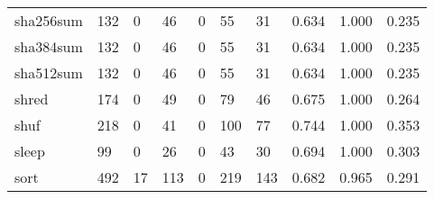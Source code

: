 \begin{longtable}{lp{2.0cm}p{2.0cm}p{2.0cm}p{2.0cm}p{2.0cm}p{2.0cm}p{2.0cm}p{2.0cm}p{2.0cm}}
sha256sum &                    132 &                                  0 &                                46 &                                0 &                                55 &                              31 &                                0.634 &                                  1.000 &                                0.235 \\
sha384sum &                    132 &                                  0 &                                46 &                                0 &                                55 &                              31 &                                0.634 &                                  1.000 &                                0.235 \\
sha512sum &                    132 &                                  0 &                                46 &                                0 &                                55 &                              31 &                                0.634 &                                  1.000 &                                0.235 \\
shred     &                    174 &                                  0 &                                49 &                                0 &                                79 &                              46 &                                0.675 &                                  1.000 &                                0.264 \\
shuf      &                    218 &                                  0 &                                41 &                                0 &                               100 &                              77 &                                0.744 &                                  1.000 &                                0.353 \\
sleep     &                     99 &                                  0 &                                26 &                                0 &                                43 &                              30 &                                0.694 &                                  1.000 &                                0.303 \\
sort      &                    492 &                                 17 &                               113 &                                0 &                               219 &                             143 &                                0.682 &                                  0.965 &                                0.291 \\

\end{longtable}
